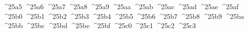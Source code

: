 {  ^^^^25a5%
  ^^^^25a6%
  ^^^^25a7%
  ^^^^25a8%
  ^^^^25a9%
  ^^^^25aa%
  ^^^^25ab%
  ^^^^25ac%
  ^^^^25ad%
  ^^^^25ae%
  ^^^^25af%
  ^^^^25b0%
  ^^^^25b1%
  ^^^^25b2%
  ^^^^25b3%
  ^^^^25b4%
  ^^^^25b5%
  ^^^^25b6%
  ^^^^25b7%
  ^^^^25b8%
  ^^^^25b9%
  ^^^^25ba%
  ^^^^25bb%
  ^^^^25bc%
  ^^^^25bd%
  ^^^^25be%
  ^^^^25bf%
  ^^^^25c0%
  ^^^^25c1%
  ^^^^25c2%
  ^^^^25c3%
}
